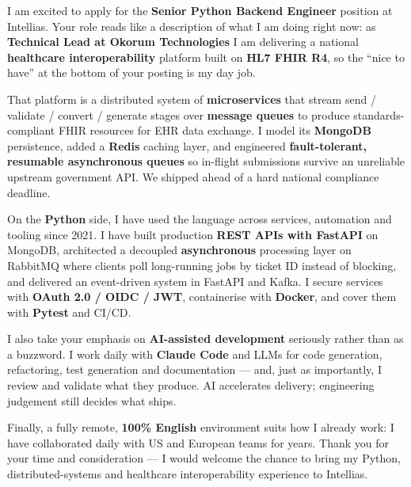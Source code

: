 \documentclass[11pt,a4paper]{awesome-cv}
\begin{document}
\makecvheader[R]
\makelettertitle

\begin{cvletter}

I am excited to apply for the \textbf{Senior Python Backend Engineer} position at Intellias. Your role reads like a description of what I am doing right now: as \textbf{Technical Lead at Okorum Technologies} I am delivering a national \textbf{healthcare interoperability} platform built on \textbf{HL7 FHIR R4}, so the ``nice to have'' at the bottom of your posting is my day job.

That platform is a distributed system of \textbf{microservices} that stream send / validate / convert / generate stages over \textbf{message queues} to produce standards-compliant FHIR resources for EHR data exchange. I model its \textbf{MongoDB} persistence, added a \textbf{Redis} caching layer, and engineered \textbf{fault-tolerant, resumable asynchronous queues} so in-flight submissions survive an unreliable upstream government API. We shipped ahead of a hard national compliance deadline.

On the \textbf{Python} side, I have used the language across services, automation and tooling since 2021. I have built production \textbf{REST APIs with FastAPI} on MongoDB, architected a decoupled \textbf{asynchronous} processing layer on RabbitMQ where clients poll long-running jobs by ticket ID instead of blocking, and delivered an event-driven system in FastAPI and Kafka. I secure services with \textbf{OAuth 2.0 / OIDC / JWT}, containerise with \textbf{Docker}, and cover them with \textbf{Pytest} and CI/CD.

I also take your emphasis on \textbf{AI-assisted development} seriously rather than as a buzzword. I work daily with \textbf{Claude Code} and LLMs for code generation, refactoring, test generation and documentation --- and, just as importantly, I review and validate what they produce. AI accelerates delivery; engineering judgement still decides what ships.

Finally, a fully remote, \textbf{100\% English} environment suits how I already work: I have collaborated daily with US and European teams for years. Thank you for your time and consideration --- I would welcome the chance to bring my Python, distributed-systems and healthcare interoperability experience to Intellias.

\end{cvletter}

\makeletterclosing
\end{document}
